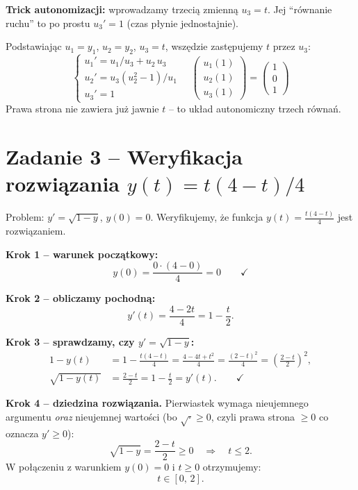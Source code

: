 \documentclass[a4paper,12pt]{article}
\begin{document}
\textbf{Trick autonomizacji:} wprowadzamy trzecią zmienną $u_3 = t$.
Jej ``równanie ruchu'' to po prostu $u_3' = 1$ (czas płynie jednostajnie).

Podstawiając $u_1 = y_1$, $u_2 = y_2$, $u_3 = t$, wszędzie zastępujemy $t$ przez $u_3$:
\[
\boxed{
\begin{cases}
u_1' = u_1/u_3 + u_2\,u_3 \\
u_2' = u_3(u_2^2 - 1)/u_1 \\
u_3' = 1
\end{cases}
}
\quad
\begin{pmatrix} u_1(1) \\ u_2(1) \\ u_3(1) \end{pmatrix}
= \begin{pmatrix} 1 \\ 0 \\ 1 \end{pmatrix}
\]
Prawa strona nie zawiera już jawnie $t$ -- to układ autonomiczny trzech równań.

\section*{Zadanie 3 -- Weryfikacja rozwiązania $y(t) = t(4-t)/4$}

Problem: $y' = \sqrt{1 - y}$, $y(0) = 0$.
Weryfikujemy, że funkcja $y(t) = \frac{t(4-t)}{4}$ jest rozwiązaniem.

\bigskip
\textbf{Krok 1 -- warunek początkowy:}
\[
y(0) = \frac{0 \cdot (4-0)}{4} = 0 \qquad \checkmark
\]

\textbf{Krok 2 -- obliczamy pochodną:}
\[
y'(t) = \frac{4 - 2t}{4} = 1 - \frac{t}{2}.
\]

\textbf{Krok 3 -- sprawdzamy, czy $y' = \sqrt{1-y}$:}
\begin{align*}
1 - y(t) &= 1 - \frac{t(4-t)}{4} = \frac{4 - 4t + t^2}{4} = \frac{(2-t)^2}{4} = \left(\frac{2-t}{2}\right)^2, \\
\sqrt{1 - y(t)} &= \frac{2-t}{2} = 1 - \frac{t}{2} = y'(t). \qquad \checkmark
\end{align*}

\textbf{Krok 4 -- dziedzina rozwiązania.}
Pierwiastek wymaga nieujemnego argumentu \emph{oraz} nieujemnej wartości
(bo $\sqrt{\cdot} \geq 0$, czyli prawa strona $\geq 0$ co oznacza $y' \geq 0$):
\[
\sqrt{1-y} = \frac{2-t}{2} \geq 0 \quad \Rightarrow \quad t \leq 2.
\]
W połączeniu z warunkiem $y(0) = 0$ i $t \geq 0$ otrzymujemy:
\[
\boxed{t \in [0,\,2].}
\]
\end{document}
